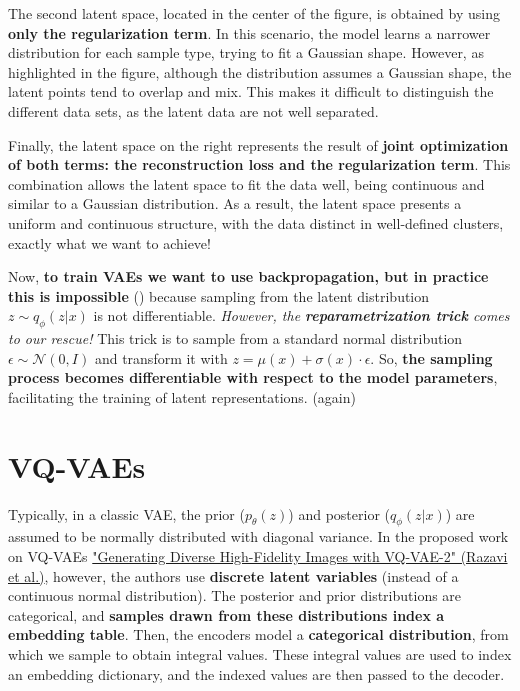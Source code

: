 The second latent space, located in the center of the figure, is obtained by using \textbf{only the regularization term}. In this scenario, the model learns a narrower distribution for each sample type, trying to fit a Gaussian shape. However, as highlighted in the figure, although the distribution assumes a Gaussian shape, the latent points tend to overlap and mix. This makes it difficult to distinguish the different data sets, as the latent data are not well separated.

Finally, the latent space on the right represents the result of \textbf{joint optimization of both terms: the reconstruction loss and the regularization term}. This combination allows the latent space to fit the data well, being continuous and similar to a Gaussian distribution. As a result, the latent space presents a uniform and continuous structure, with the data distinct in well-defined clusters, exactly what we want to achieve! 


Now, \textbf{to train VAEs we want to use backpropagation, but in practice this is impossible} () because sampling from the latent distribution $z \sim q_{\phi}(z|x)$ is not differentiable. \textit{However, the \textit{\textbf{reparametrization trick}} comes to our rescue!} This trick is to sample from a standard normal distribution $\epsilon \sim \mathcal{N}(0, I)$ and transform it with $z = \mu(x) + \sigma(x) \cdot \epsilon$. So, \textbf{the sampling process becomes differentiable with respect to the model parameters}, facilitating the training of latent representations.  (again)


\section{VQ-VAEs}

Typically, in a classic VAE, the prior ($p_{\theta}(z)$) and posterior ($q_{\phi}(z|x)$) are assumed to be normally distributed with diagonal variance. In the proposed work on VQ-VAEs \href{https://arxiv.org/pdf/1906.00446}{"Generating Diverse High-Fidelity Images with VQ-VAE-2" (Razavi et al.)}, however, the authors use \textbf{discrete latent variables} (instead of a continuous normal distribution). The posterior and prior distributions are categorical, and \textbf{samples drawn from these distributions index a embedding table}. Then, the encoders model a \textbf{categorical distribution}, from which we sample to obtain integral values. These integral values are used to index an embedding dictionary, and the indexed values are then passed to the decoder.


